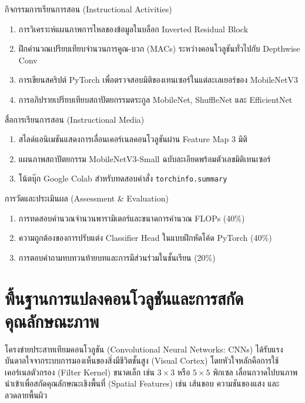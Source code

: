 \begin{planbox}{กิจกรรมการเรียนการสอน (Instructional Activities)}
\begin{enumerate}[leftmargin=1.5em, itemsep=2pt]
    \item การวิเคราะห์แผนภาพการไหลของข้อมูลในบล็อก Inverted Residual Block
    \item ฝึกคำนวณเปรียบเทียบจำนวนการคูณ-บวก (MACs) ระหว่างคอนโวลูชันทั่วไปกับ Depthwise Conv
    \item การเขียนสคริปต์ PyTorch เพื่อตรวจสอบมิติของเทนเซอร์ในแต่ละเลเยอร์ของ MobileNetV3
    \item การอภิปรายเปรียบเทียบสถาปัตยกรรมตระกูล MobileNet, ShuffleNet และ EfficientNet
\end{enumerate}
\end{planbox}

\begin{planbox}{สื่อการเรียนการสอน (Instructional Media)}
\begin{enumerate}[leftmargin=1.5em, itemsep=2pt]
    \item สไลด์แอนิเมชันแสดงการเลื่อนเคอร์เนลคอนโวลูชันผ่าน Feature Map 3 มิติ
    \item แผนภาพสถาปัตยกรรม MobileNetV3-Small ฉบับละเอียดพร้อมตัวเลขมิติเทนเซอร์
    \item โน้ตบุ๊ก Google Colab สำหรับทดสอบคำสั่ง \texttt{torchinfo.summary}
\end{enumerate}
\end{planbox}

\begin{planbox}{การวัดและประเมินผล (Assessment \& Evaluation)}
\begin{enumerate}[leftmargin=1.5em, itemsep=2pt]
    \item การทดสอบคำนวณจำนวนพารามิเตอร์และขนาดการคำนวณ FLOPs (40\%)
    \item ความถูกต้องของการปรับแต่ง Classifier Head ในแบบฝึกหัดโค้ด PyTorch (40\%)
    \item การตอบคำถามทบทวนท้ายบทและการมีส่วนร่วมในชั้นเรียน (20\%)
\end{enumerate}
\end{planbox}

\clearpage

\section{พื้นฐานการแปลงคอนโวลูชันและการสกัดคุณลักษณะภาพ}

โครงข่ายประสาทเทียมคอนโวลูชัน (Convolutional Neural Networks: CNNs) ได้รับแรงบันดาลใจจากระบบการมองเห็นของสิ่งมีชีวิตชั้นสูง (Visual Cortex) โดยหัวใจหลักคือการใช้เคอร์เนลตัวกรอง (Filter Kernel) ขนาดเล็ก เช่น $3 \times 3$ หรือ $5 \times 5$ พิกเซล เลื่อนกวาดไปบนภาพนำเข้าเพื่อสกัดคุณลักษณะเชิงพื้นที่ (Spatial Features) เช่น เส้นขอบ ความชันของแสง และลวดลายพื้นผิว

